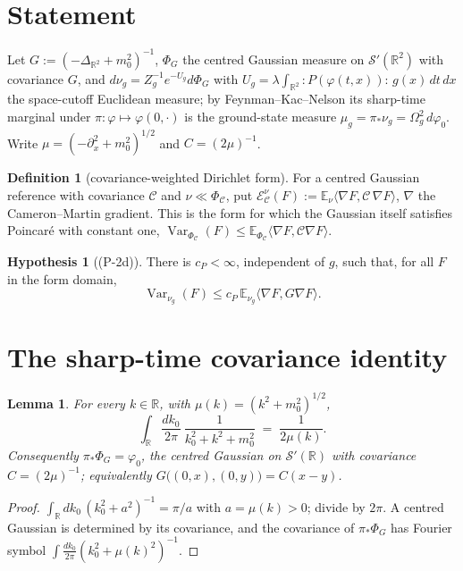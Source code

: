 \documentclass[11pt,a4paper]{article}
\theoremstyle{plain}
\newtheorem{lemma}[theorem]{Lemma}
\theoremstyle{definition}
\newtheorem{definition}[theorem]{Definition}
\newtheorem{hypothesis}[theorem]{Hypothesis}
\newcommand{\R}{\mathbb{R}}
\newcommand{\E}{\mathbb{E}}
\newcommand{\Sw}{\mathcal S'}
\newcommand{\ip}[2]{\langle #1,#2\rangle}
\DeclareMathOperator{\Var}{Var}
\begin{document}
\section{Statement}

Let $G:=(-\Delta_{\R^2}+m_0^2)^{-1}$, $\Phi_G$ the centred Gaussian measure on $\Sw(\R^2)$ with
covariance $G$, and $d\nu_g=Z_g^{-1}e^{-U_g}d\Phi_G$ with
$U_g=\lambda\int_{\R^2}{:}P(\varphi(t,x)){:}\,g(x)\,dt\,dx$ the space-cutoff Euclidean measure; by
Feynman--Kac--Nelson its sharp-time marginal under $\pi:\varphi\mapsto\varphi(0,\cdot)$ is the
ground-state measure $\mu_g=\pi_*\nu_g=\Omega_g^2\,d\varphi_0$. Write $\mu=(-\partial_x^2+m_0^2)^{1/2}$
and $C=(2\mu)^{-1}$.

\begin{definition}[covariance-weighted Dirichlet form]\label{def:form}
For a centred Gaussian reference with covariance $\mathcal C$ and $\nu\ll\Phi_{\mathcal C}$, put
$\mathcal E_{\mathcal C}^\nu(F):=\E_\nu\ip{\nabla F}{\mathcal C\,\nabla F}$, $\nabla$ the
Cameron--Martin gradient. This is the form for which the Gaussian itself satisfies Poincar\'e with
constant one, $\Var_{\Phi_{\mathcal C}}(F)\le\E_{\Phi_{\mathcal C}}\ip{\nabla F}{\mathcal C\nabla F}$.
\end{definition}

\begin{hypothesis}[(P-2d)]\label{hyp:P2d}
There is $c_P<\infty$, independent of $g$, such that, for all $F$ in the form domain,
\[
 \Var_{\nu_g}(F)\le c_P\,\E_{\nu_g}\ip{\nabla F}{G\nabla F}.
\]
\end{hypothesis}

\section{The sharp-time covariance identity}

\begin{lemma}\label{lem:sharptime}
For every $k\in\R$, with $\mu(k)=(k^2+m_0^2)^{1/2}$,
\[
  \int_\R\frac{dk_0}{2\pi}\ \frac{1}{k_0^2+k^2+m_0^2}\;=\;\frac{1}{2\mu(k)} .
\]
Consequently $\pi_*\Phi_G=\varphi_0$, the centred Gaussian on $\Sw(\R)$ with covariance
$C=(2\mu)^{-1}$; equivalently $G\bigl((0,x),(0,y)\bigr)=C(x-y)$.
\end{lemma}

\begin{proof}
$\int_\R dk_0\,(k_0^2+a^2)^{-1}=\pi/a$ with $a=\mu(k)>0$; divide by $2\pi$. A centred Gaussian is
determined by its covariance, and the covariance of $\pi_*\Phi_G$ has Fourier symbol
$\int\frac{dk_0}{2\pi}(k_0^2+\mu(k)^2)^{-1}$.
\end{proof}
\end{document}
